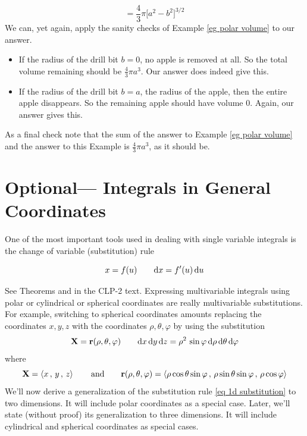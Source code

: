 \begin{eg}
\begin{equation*}
=\frac{4}{3}\pi\big[a^2-b^2\big]^{3/2}
\end{equation*}
We can, yet again, apply the sanity checks of Example \ref{eg polar volume}
to our answer.
\begin{itemize}
\item 
If the radius of the drill bit $b=0$, no apple is removed at all.
So the total volume remaining should be $\frac{4}{3}\pi a^3$.
Our answer does indeed give this.
\item
If the radius of the drill bit $b=a$, the radius of the apple,
then the entire apple disappears. So the remaining apple should have 
volume $0$. Again, our answer gives this.
\end{itemize}
As a final check note that the sum of the answer to 
Example \ref{eg polar volume} and the answer to this Example 
is $\frac{4}{3}\pi a^3$, as it should be.
\end{eg}

\section{Optional--- Integrals in General Coordinates} \label{sec Jacobian}
One of the most important tools used in dealing with single variable
integrals is the change of variable (substitution) rule
\begin{impeqn}\label{eq 1d substitution}
\begin{equation*}
x=f(u)\qquad
\mathrm{d}x = f'(u)\,\mathrm{d}u
\end{equation*}
\end{impeqn}
\noindent
See Theorems  and 
in the CLP-2 text.
Expressing multivariable integrals using polar or cylindrical or
spherical coordinates are really  multivariable substitutions. For example,
switching to spherical coordinates amounts replacing the coordinates $x,y,z$ with the coordinates $\rho,\theta,\varphi$ by using the substitution
\begin{equation*}
\mathbf{X} =\mathbf{r}(\rho,\theta,\varphi)\qquad
\mathrm{d}x\,\mathrm{d}y\,\mathrm{d}z 
       = \rho^2\,\sin\varphi\,\mathrm{d}\rho\,\mathrm{d}\theta\,\mathrm{d}\varphi
\end{equation*}
where
\begin{equation*}
\mathbf{X}=\left< x\,,\, y\,,\, z\right>\qquad\text{and}\qquad
\mathbf{r}(\rho,\theta,\varphi)=\left< \rho\cos\theta\sin\varphi\,,\,
                              \rho\sin\theta\sin\varphi\,,\,
                              \rho\cos\varphi\right>
\end{equation*}
We'll now derive a generalization of the substitution rule 
\eqref{eq 1d substitution} to two dimensions. It will include polar
coordinates as a special case. Later, we'll state (without proof) 
its generalization to three dimensions. It will include cylindrical and
spherical coordinates as special cases.


